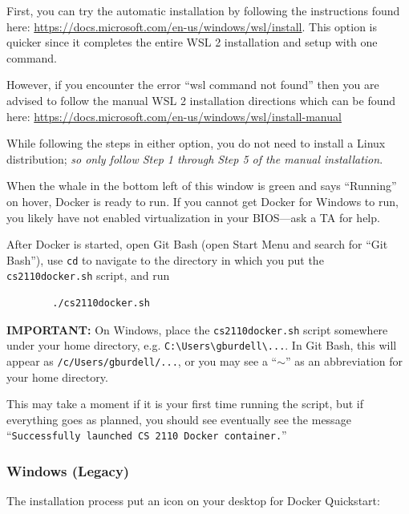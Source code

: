 First, you can try the automatic installation by following the instructions found here: \href{https://docs.microsoft.com/en-us/windows/wsl/install}{https://docs.microsoft.com/en-us/windows/wsl/install}.
This option is quicker since it completes the entire WSL 2 installation and setup with one command.

However, if you encounter the error ``wsl command not found'' then you are advised to follow the manual WSL 2 installation directions which can be found here: \href{https://docs.microsoft.com/en-us/windows/wsl/install-manual}{https://docs.microsoft.com/en-us/windows/wsl/install-manual}

While following the steps in either option, you do not need to install a Linux distribution; \textit{so only follow Step 1 through Step 5 of the manual installation}.

When the whale in the bottom left of this window is green and says ``Running'' on hover, Docker is ready to run. If you cannot get Docker for Windows to run, you likely have not enabled virtualization in your BIOS---ask a TA for help.

After Docker is started, open Git Bash (open Start Menu and search for ``Git Bash''), use \texttt{cd} to navigate to the directory in which you put the \texttt{cs2110docker.sh} script, and run

\begin{center}
    \begin{verbatim}
        ./cs2110docker.sh
    \end{verbatim}
\end{center}

\textbf{IMPORTANT:} On Windows, place the \texttt{cs2110docker.sh} script somewhere under your home directory, e.g. \texttt{C:\textbackslash{}Users\textbackslash{}gburdell\textbackslash{}...}. In Git Bash, this will appear as \texttt{/c/Users/gburdell/...}, or you may see a ``\texttt{$\sim$}'' as an abbreviation for your home directory.

This may take a moment if it is your first time running the script, but if everything goes as planned, you should see eventually see the message ``\texttt{Successfully launched CS 2110 Docker container.}''

\subsubsection{Windows (Legacy)}

The installation process put an icon on your desktop for Docker Quickstart:


